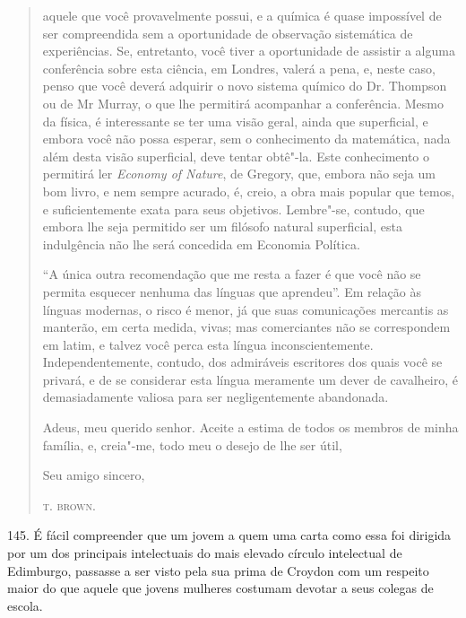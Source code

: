 \begin{quote}
aquele que você provavelmente possui, e a química é quase impossível de
ser compreendida sem a oportunidade de observação sistemática de
experiências. Se, entretanto, você tiver a oportunidade de assistir a
alguma conferência sobre esta ciência, em Londres, valerá a pena, e,
neste caso, penso que você deverá adquirir o novo sistema químico do Dr.
Thompson ou de Mr Murray, o que lhe permitirá acompanhar a conferência.
Mesmo da física, é interessante se ter uma visão geral, ainda que
superficial, e embora você não possa esperar, sem o conhecimento da
matemática, nada além desta visão superficial, deve tentar obtê"-la. Este
conhecimento o permitirá ler \emph{Economy of Nature}, de Gregory, que,
embora não seja um bom livro, e nem sempre acurado, é, creio, a obra
mais popular que temos, e suficientemente exata para seus objetivos.
Lembre"-se, contudo, que embora lhe seja permitido ser um filósofo
natural superficial, esta indulgência não lhe será concedida em Economia
Política.

``A única outra recomendação que me resta a fazer é que você não se
permita esquecer nenhuma das línguas que aprendeu''. Em relação às
línguas modernas, o risco é menor, já que suas comunicações mercantis as
manterão, em certa medida, vivas; mas comerciantes não se correspondem
em latim, e talvez você perca esta língua inconscientemente.
Independentemente, contudo, dos admiráveis escritores dos quais você se
privará, e de se considerar esta língua meramente um dever de
cavalheiro, é demasiadamente valiosa para ser negligentemente
abandonada.

Adeus, meu querido senhor. Aceite a estima de todos os membros de minha
família, e, creia"-me, todo meu o desejo de lhe ser útil,

\bigskip

\hfill{}Seu amigo sincero,

\hfill{}\textsc{t. brown.}
\end{quote}

145. É fácil compreender que um jovem a quem uma carta como essa foi
dirigida por um dos principais intelectuais do mais elevado círculo
intelectual de Edimburgo, passasse a ser visto pela sua prima de Croydon
com um respeito maior do que aquele que jovens mulheres costumam devotar
a seus colegas de escola.

